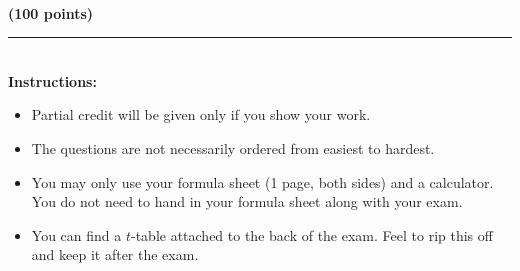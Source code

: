 \documentclass[12pt]{article}
\begin{document}
\begin{center}
  \textbf{\large \semester{}} \hfill \textbf{\large \class{}} \hfill \textbf{\large \exam{}}\\
  \hfill \textbf{(100 points)}
\end{center}

\vspace*{1in}

 \rule{5in}{.01in}\\[1in]

\textbf{Instructions:}\\
\begin{itemize}
\item {\large Partial credit will be given only if you show your work.}
\item {\large The questions are not necessarily ordered from easiest to hardest.}
\item {\large You may only use your formula sheet (1 page, both sides) and a calculator. You do not need to hand in your formula sheet along with your exam.}
\item {\large You can find a $t$-table attached to the back of the exam. Feel to rip this off and keep it after the exam.}
\end{itemize}
\end{document}
